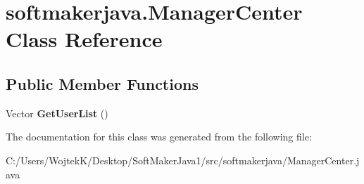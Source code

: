 \hypertarget{classsoftmakerjava_1_1_manager_center}{}\section{softmakerjava.\+Manager\+Center Class Reference}
\label{classsoftmakerjava_1_1_manager_center}
\subsection*{Public Member Functions}
\begin{DoxyCompactItemize}
\item 
Vector {\bfseries Get\+User\+List} ()\hypertarget{classsoftmakerjava_1_1_manager_center_a24a47d603a8c18d90d12e22e699c34f7}{}\label{classsoftmakerjava_1_1_manager_center_a24a47d603a8c18d90d12e22e699c34f7}

\end{DoxyCompactItemize}


The documentation for this class was generated from the following file\+:\begin{DoxyCompactItemize}
\item 
C\+:/\+Users/\+Wojtek\+K/\+Desktop/\+Soft\+Maker\+Java1/src/softmakerjava/Manager\+Center.\+java\end{DoxyCompactItemize}
